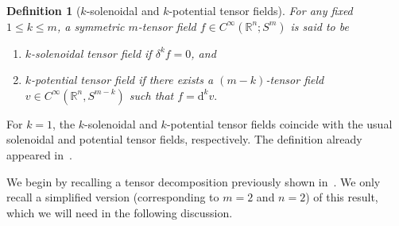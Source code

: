 \documentclass[11pt]{article}
\newcommand{\D}{\mathrm{d}}
\newcommand{\Rb}{\mathbb{R}}
\newtheorem{definition}[theorem]{Definition}
\begin{document}
\begin{definition}[$k$-solenoidal and $k$-potential tensor fields]\label{def:k-potential and k-solenoidal}
For any fixed $1 \leq k \leq m$, a symmetric $m$-tensor field $f \in C^\infty(\Rb^n;S^m)$ is said to be 
\begin{enumerate}
    \item $k$-solenoidal tensor field if   $\delta^k f = 0$, and
\item $k$-potential tensor field if there exists a $(m-k)$-tensor field $v \in C^\infty(\Rb^n, S^{m-k})$ such that   $ f = \D^k v.$  %
\end{enumerate}
\end{definition}
\noindent For $k=1$, the $k$-solenoidal and $k$-potential tensor fields coincide with the usual solenoidal and potential tensor fields, respectively. The definition already appeared in~\cite[Definition 3.1]{Rohit_Suman}.

We begin by recalling a tensor decomposition previously shown in~\cite[Lemma 3.2]{Rohit_Suman}. We only recall a simplified version (corresponding to $m=2$ and $n=2$) of this result, which we will need in the following discussion. 
\end{document}
